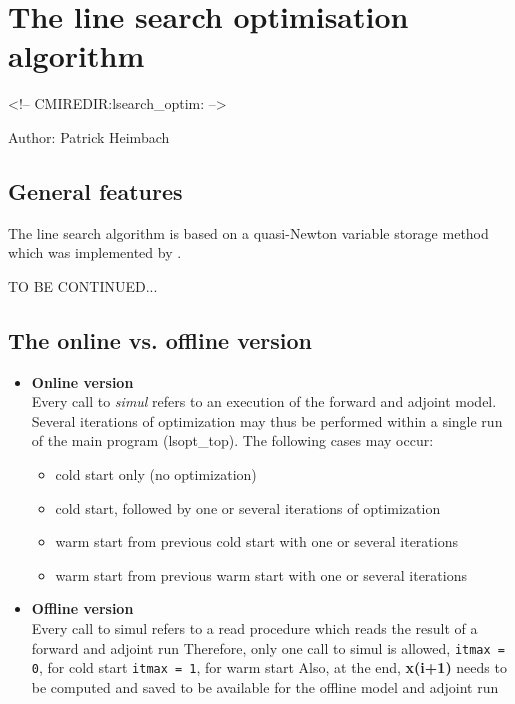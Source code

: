 \section{The line search optimisation algorithm
\label{sectionoptim}}
\begin{rawhtml}
<!-- CMIREDIR:lsearch_optim: -->
\end{rawhtml}

Author: Patrick Heimbach

\subsection{General features}

The line search algorithm is based on a quasi-Newton
variable storage method which was implemented by
\cite{gil-lem:89}.

TO BE CONTINUED...

\subsection{The online vs. offline version}

\begin{itemize}
%
\item {\bf Online version} \\
Every call to {\it simul} refers to an execution of the 
forward and adjoint model.
Several iterations of optimization may thus be performed within
a single run of the main program (lsopt\_top).
The following cases may occur:
%
\begin{itemize}
\item
cold start only (no optimization)
\item
cold start, followed by one or several iterations of optimization
\item
warm start from previous cold start with one or several iterations
\item
warm start from previous warm start with one or several iterations
\end{itemize}
%
\item {\bf Offline version} \\
Every call to simul refers to a read procedure which
reads the result of a forward and adjoint run
Therefore, only one call to simul is allowed,
                     {\tt itmax = 0}, for cold start
                     {\tt itmax = 1}, for warm start
Also, at the end, {\bf x(i+1)} needs to be computed and saved
to be available for the offline model and adjoint run
\end{itemize}

